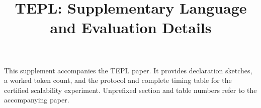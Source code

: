 \documentclass[acmsmall,review,screen,anonymous,nonacm]{acmart}
\title{TEPL: Supplementary Language and Evaluation Details}
\begin{document}
\renewcommand{\thelstlisting}{S\arabic{lstlisting}}
\maketitle
This supplement accompanies the TEPL paper. It provides declaration sketches,
a worked token count, and the protocol and complete timing table for the
certified scalability experiment. Unprefixed section and table numbers
refer to the accompanying paper.

\FloatBarrier

\FloatBarrier
\clearpage

\FloatBarrier
\end{document}
